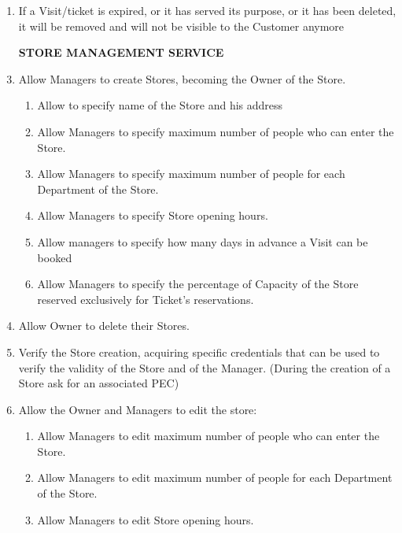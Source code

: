 \documentclass[a4paper, 10pt, oneside]{article}
\newcommand*{\lorenzo}[1]{\textcolor{BurntOrange}{#1}}
\begin{document}
\begin{enumerate}[align=left, label={R.\arabic{*}}]
    \item \label{req:expiredTickOrVis} If a Visit/ticket is expired, or it has served its purpose, or it has been deleted, it will be removed and will not be visible to the Customer anymore 
    
    \item[\textbf{STORE MANAGEMENT SERVICE}]
    \item \label{req:man:createStore}Allow Managers to create Stores, becoming the Owner of the Store.
    \begin{enumerate}[label={-}]
        \item \label{req:man:createStore:nameAndLoc}Allow to specify name of the Store and his address
         \item \label{req:man:createStore:maxPeople}Allow Managers to specify maximum number of people who can enter the Store.
        \item \label{req:man:createStore:maxPeoplePerDep}Allow Managers to specify maximum number of people for each Department of the Store.
        \item \label{req:man:createStore:openingHours}Allow Managers to specify Store opening hours.
        \item \label{req:man:createStore:daysToBook}Allow managers to specify how many days in advance a Visit can be booked
        \item \label{req:man:createStore:percentageTicket} Allow Managers to specify the percentage of Capacity of the Store reserved exclusively for Ticket's reservations.
    \end{enumerate}
    \item \label{req:man:deleteStore}Allow Owner to delete their Stores.
    \item \label{req:man:verifyOwnerCred}Verify the Store creation, acquiring specific credentials that can be used to verify the validity of the Store and of the Manager. \lorenzo{(During the creation of a Store ask for an associated PEC)}
    \item \label{req:man:updateStoreInfo}Allow the Owner and Managers to edit the store:
    \begin{enumerate}[label={-}]
         \item \label{req:man:updateStoreInfo:maxPeople}Allow Managers to edit maximum number of people who can enter the Store.
        \item \label{req:man:updateStoreInfo:maxPeoplePerDep}Allow Managers to edit maximum number of people for each Department of the Store.
        \item \label{req:man:updateStoreInfo:openingHours}Allow Managers to edit Store opening hours.

\end{enumerate}
\end{enumerate}
\end{document}
